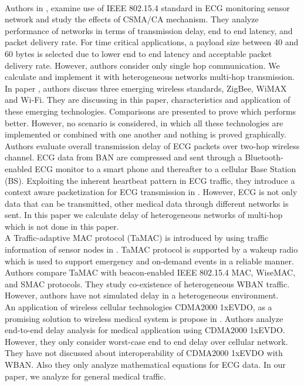 \documentclass[11pt, conference, compsocconf, onecolumn]{IEEEtran}
\begin{document}
\\
\indent Authors in \cite{6}, examine use of IEEE 802.15.4 standard in ECG monitoring sensor network and study the effects of CSMA/CA mechanism. They analyze performance of networks in terms of transmission delay, end to end latency, and packet delivery rate. For time critical applications, a payload size between 40 and 60 bytes is selected due to lower end to end latency and acceptable packet delivery rate. However, authors consider only single hop communication. We calculate and implement it with heterogeneous networks multi-hop transmission.
\\
\indent In paper \cite{10}, authors discuss three emerging wireless standards, ZigBee, WiMAX and Wi-Fi. They are discussing in this paper, characteristics and application of these emerging technologies. Comparisons are presented to prove which performs better. However, no scenario is considered, in which all these technologies are implemented or combined with one another and nothing is proved graphically.
\\
Authors evaluate overall transmission delay of ECG packets over two-hop wireless channel.  ECG data from  BAN are compressed and sent through a Bluetooth-enabled ECG monitor to a smart phone and thereafter to a cellular Base Station (BS). Exploiting the inherent heartbeat pattern in ECG traffic, they introduce a context aware packetization for ECG transmission in \cite{1}. However, ECG is not only data that can be transmitted, other medical data through different networks is sent. In this paper we calculate delay of heterogeneous networks of multi-hop which is not done in this paper.
\\
\indent A Traffic-adaptive MAC protocol (TaMAC) is introduced by using traffic information of sensor nodes in \cite{8}. TaMAC protocol is supported by a wakeup radio which is used to support emergency and on-demand events in a reliable manner. Authors compare TaMAC with beacon-enabled IEEE 802.15.4 MAC, WiseMAC, and SMAC protocols. They study co-existence of heterogeneous WBAN traffic. However, authors have not simulated delay in a heterogeneous environment.
\\
\indent An application of wireless cellular technologies CDMA2000 1xEVDO, as a promising solution to wireless medical system is propose in \cite{5}. Authors analyze end-to-end delay analysis for medical application using CDMA2000 1xEVDO. However, they only consider worst-case end to end delay over cellular network. They have not discussed about interoperability of CDMA2000 1xEVDO with WBAN. Also they only analyze mathematical equations for ECG data. In our paper, we analyze for general medical traffic.
\end{document}
